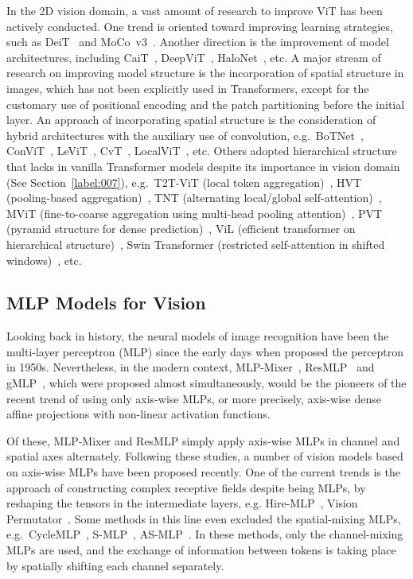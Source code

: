 \documentclass{article}
\begin{document}
In the 2D vision domain, a vast amount of research to improve ViT has been actively conducted. 
One trend is oriented toward improving learning strategies, such as DeiT~\citep{touvron2021training} and MoCo~v3~\citep{chen2021empirical}.
Another direction is the improvement of model architectures,
including
CaiT~\citep{touvron2021going},
DeepViT~\citep{zhou2021deepvit},
HaloNet~\citep{vaswani2021scaling},
etc.
A major stream of research on improving model structure is the incorporation of spatial structure in images, which has not been explicitly used in Transformers, except for the customary use of positional encoding and the patch partitioning before the initial layer.
An approach of incorporating spatial structure is the consideration of hybrid architectures with the auxiliary use of convolution,
e.g.\ BoTNet~\citep{srinivas2021bottleneck}, ConViT~\citep{d2021convit}, LeViT~\citep{graham2021levit}, CvT~\citep{wu2021cvt}, LocalViT~\citep{li2021localvit}, etc.
Others adopted hierarchical structure that lacks in vanilla Transformer models despite its importance in vision domain (See Section~\ref{label:007}), e.g.\ 
T2T-ViT (local token aggregation)~\citep{yuan2021tokens}, HVT (pooling-based aggregation)~\citep{pan2021scalable},
TNT (alternating local/global self-attention)~\citep{han2021transformer},
MViT (fine-to-coarse aggregation using multi-head pooling attention)~\citep{fan2021multiscale},
PVT (pyramid structure for dense prediction)~\citep{wang2021pyramid}, ViL (efficient transformer on hierarchical structure)~\citep{zhang2021multi},
Swin Transformer (restricted self-attention in shifted windows)~\citep{liu2021swin}, etc.

\subsection{MLP Models for Vision}\label{label:006}

Looking back in history, the neural models of image recognition have been the multi-layer perceptron (MLP) since the early days when \citet{rosenblatt1958perceptron} proposed the perceptron in 1950s. Nevertheless, in the modern context, MLP-Mixer~\citep{tolstikhin2021mlp}, ResMLP~\citep{touvron2021resmlp} and gMLP~\citep{liu2021pay}, which were proposed almost simultaneously, would be the pioneers of the recent trend of using only axis-wise MLPs,
or more precisely, axis-wise dense affine projections with non-linear activation functions.

Of these, MLP-Mixer and ResMLP simply apply axis-wise MLPs in channel and spatial axes alternately. Following these studies, a number of vision models based on axis-wise MLPs have been proposed recently. One of the current trends is the approach of constructing complex receptive fields despite being MLPs, by reshaping the tensors in the intermediate layers,
e.g. Hire-MLP~\citep{guo2021hire}, Vision Permutator~\citep{hou2022vision}.
Some methods in this line even excluded the spatial-mixing MLPs, e.g.\ CycleMLP~\citep{chen2021cyclemlp}, S-MLP~\citep{yu2022s2}, AS-MLP~\citep{lian2021mlp}. In these methods, only the channel-mixing MLPs are used, and the exchange of information between tokens is taking place by spatially shifting each channel separately. 
\end{document}
